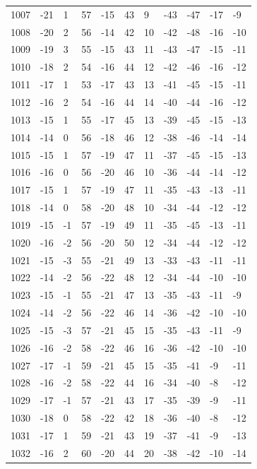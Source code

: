 \begin{table}[H]
\begin{tabular}{lllllllllll}
1007 & -21 & 1 & 57 & -15 & 43 & 9 & -43 & -47 & -17 & -9 \\
1008 & -20 & 2 & 56 & -14 & 42 & 10 & -42 & -48 & -16 & -10 \\
1009 & -19 & 3 & 55 & -15 & 43 & 11 & -43 & -47 & -15 & -11 \\
1010 & -18 & 2 & 54 & -16 & 44 & 12 & -42 & -46 & -16 & -12 \\
1011 & -17 & 1 & 53 & -17 & 43 & 13 & -41 & -45 & -15 & -11 \\
1012 & -16 & 2 & 54 & -16 & 44 & 14 & -40 & -44 & -16 & -12 \\
1013 & -15 & 1 & 55 & -17 & 45 & 13 & -39 & -45 & -15 & -13 \\
1014 & -14 & 0 & 56 & -18 & 46 & 12 & -38 & -46 & -14 & -14 \\
1015 & -15 & 1 & 57 & -19 & 47 & 11 & -37 & -45 & -15 & -13 \\
1016 & -16 & 0 & 56 & -20 & 46 & 10 & -36 & -44 & -14 & -12 \\
1017 & -15 & 1 & 57 & -19 & 47 & 11 & -35 & -43 & -13 & -11 \\
1018 & -14 & 0 & 58 & -20 & 48 & 10 & -34 & -44 & -12 & -12 \\
1019 & -15 & -1 & 57 & -19 & 49 & 11 & -35 & -45 & -13 & -11 \\
1020 & -16 & -2 & 56 & -20 & 50 & 12 & -34 & -44 & -12 & -12 \\
1021 & -15 & -3 & 55 & -21 & 49 & 13 & -33 & -43 & -11 & -11 \\
1022 & -14 & -2 & 56 & -22 & 48 & 12 & -34 & -44 & -10 & -10 \\
1023 & -15 & -1 & 55 & -21 & 47 & 13 & -35 & -43 & -11 & -9 \\
1024 & -14 & -2 & 56 & -22 & 46 & 14 & -36 & -42 & -10 & -10 \\
1025 & -15 & -3 & 57 & -21 & 45 & 15 & -35 & -43 & -11 & -9 \\
1026 & -16 & -2 & 58 & -22 & 46 & 16 & -36 & -42 & -10 & -10 \\
1027 & -17 & -1 & 59 & -21 & 45 & 15 & -35 & -41 & -9 & -11 \\
1028 & -16 & -2 & 58 & -22 & 44 & 16 & -34 & -40 & -8 & -12 \\
1029 & -17 & -1 & 57 & -21 & 43 & 17 & -35 & -39 & -9 & -11 \\
1030 & -18 & 0 & 58 & -22 & 42 & 18 & -36 & -40 & -8 & -12 \\
1031 & -17 & 1 & 59 & -21 & 43 & 19 & -37 & -41 & -9 & -13 \\
1032 & -16 & 2 & 60 & -20 & 44 & 20 & -38 & -42 & -10 & -14 \\

\end{tabular}
\end{table}
